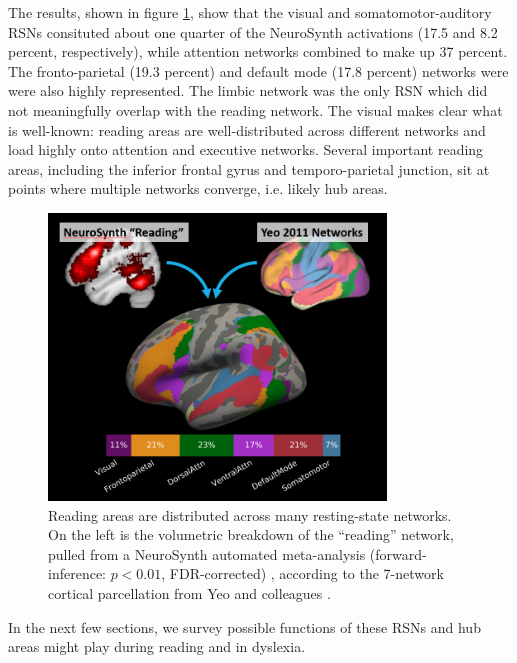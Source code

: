 The results, shown in figure \ref{fig:ch1-yeo-to-neurosynth}, show that the visual and somatomotor-auditory RSNs consituted about one quarter of the NeuroSynth activations (17.5 and 8.2 percent, respectively), while attention networks combined to make up 37 percent. The fronto-parietal (19.3 percent) and default mode (17.8 percent) networks were were also highly represented. The limbic network was the only RSN which did not meaningfully overlap with the reading network. The visual makes clear what is well-known: reading areas are well-distributed across different networks and load highly onto attention and executive networks. Several important reading areas, including the inferior frontal gyrus and temporo-parietal junction, sit at points where multiple networks converge, i.e. likely hub areas.

\begin{figure}[t]
\centering
\includegraphics[height=3in]{images/ch1-yeo-to-neurosynth.png}
    \caption[Reading areas are distributed across many resting-state networks.]{Reading areas are distributed across many resting-state networks. On the left is the volumetric breakdown of the ``reading'' network, pulled from a NeuroSynth automated meta-analysis (forward-inference: $p < 0.01$, FDR-corrected) \citep{Yarkoni2011}, according to the 7-network cortical parcellation from Yeo and colleagues \citep{Yeo2011}.}
    \label{fig:ch1-yeo-to-neurosynth}
\end{figure}

In the next few sections, we survey possible functions of these RSNs and hub areas might play during reading and in dyslexia.  

